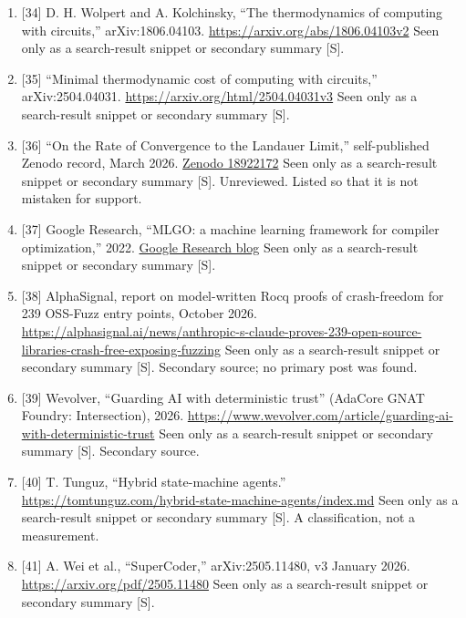 \documentclass[10pt,letterpaper]{article}
\begin{document}
\begin{enumerate}
  Iterative LLM-Based Code Optimizations,'' arXiv:2610.32891, October
  2026. \url{https://arxiv.org/abs/2610.32891} Seen only as a
  search-result snippet or secondary summary {[}S{]}.
\item
  {[}34{]} D. H. Wolpert and A. Kolchinsky, ``The thermodynamics of
  computing with circuits,'' arXiv:1806.04103.
  \url{https://arxiv.org/abs/1806.04103v2} Seen only as a search-result
  snippet or secondary summary {[}S{]}.
\item
  {[}35{]} ``Minimal thermodynamic cost of computing with circuits,''
  arXiv:2504.04031. \url{https://arxiv.org/html/2504.04031v3} Seen only
  as a search-result snippet or secondary summary {[}S{]}.
\item
  {[}36{]} ``On the Rate of Convergence to the Landauer Limit,''
  self-published Zenodo record, March 2026.
  \href{https://zenodo.org/records/18922172}{Zenodo 18922172} Seen only
  as a search-result snippet or secondary summary {[}S{]}. Unreviewed.
  Listed so that it is not mistaken for support.
\item
  {[}37{]} Google Research, ``MLGO: a machine learning framework for
  compiler optimization,'' 2022.
  \href{https://www.research.google/blog/mlgo-a-machine-learning-framework-for-compiler-optimization/}{Google
  Research blog} Seen only as a search-result snippet or secondary
  summary {[}S{]}.
\item
  {[}38{]} AlphaSignal, report on model-written Rocq proofs of
  crash-freedom for 239 OSS-Fuzz entry points, October 2026.
  \url{https://alphasignal.ai/news/anthropic-s-claude-proves-239-open-source-libraries-crash-free-exposing-fuzzing}
  Seen only as a search-result snippet or secondary summary {[}S{]}.
  Secondary source; no primary post was found.
\item
  {[}39{]} Wevolver, ``Guarding AI with deterministic trust'' (AdaCore
  GNAT Foundry: Intersection), 2026.
  \url{https://www.wevolver.com/article/guarding-ai-with-deterministic-trust}
  Seen only as a search-result snippet or secondary summary {[}S{]}.
  Secondary source.
\item
  {[}40{]} T. Tunguz, ``Hybrid state-machine agents.''
  \url{https://tomtunguz.com/hybrid-state-machine-agents/index.md} Seen
  only as a search-result snippet or secondary summary {[}S{]}. A
  classification, not a measurement.
\item
  {[}41{]} A. Wei et al., ``SuperCoder,'' arXiv:2505.11480, v3 January
  2026. \url{https://arxiv.org/pdf/2505.11480} Seen only as a
  search-result snippet or secondary summary {[}S{]}.

\end{enumerate}
\end{document}
